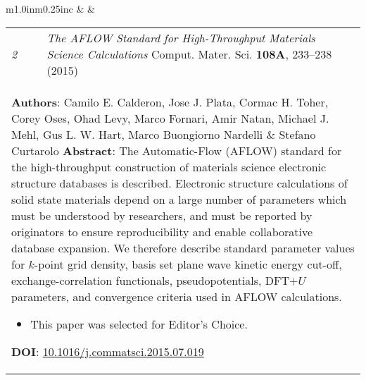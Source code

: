 \documentclass[11pt]{article}
\begin{document}
\vspace{0.25cm}

\begin{tabular}{m{1.0in}m{0.25in}c}
 & & 
\begin{tabular}{m{0.3in}m{0.15in}m{4.3in}}
\textit{\small{2}} & & \textit{The {\small AFLOW} Standard for High-Throughput Materials Science Calculations} \newline Comput. Mater. Sci. \textbf{108A}, 233--238 (2015)  \\ \multicolumn{3}{p{4.75in}}{\footnotesize{\textbf{Authors}: Camilo E. Calderon, Jose J. Plata, Cormac H. Toher, \textcolor{NavyBlue}{Corey Oses}, Ohad Levy, Marco Fornari, Amir Natan, Michael J. Mehl, Gus L. W. Hart, Marco Buongiorno Nardelli \& Stefano Curtarolo \newline \textbf{Abstract}: The Automatic-Flow ({\small AFLOW}) standard for the high-throughput construction of materials science electronic structure databases is described. Electronic structure calculations of solid state materials depend on a large number of parameters which must be understood by researchers, and must be reported by originators to ensure reproducibility and enable collaborative database expansion. We therefore describe standard parameter values for $k$-point grid density, basis set plane wave kinetic energy cut-off, exchange-correlation functionals, pseudopotentials, DFT$+U$ parameters, and convergence criteria used in {\small AFLOW} calculations. \noindent\begin{itemize}[leftmargin=*] \item This paper was selected for \textcolor{NavyBlue}{Editor's Choice}. \end{itemize} \textbf{DOI}: \href{http://dx.doi.org/10.1016/j.commatsci.2015.07.019}{10.1016/j.commatsci.2015.07.019}}} 
\end{tabular} \\ 
\end{tabular}

\vspace{0.25cm}
\end{document}
